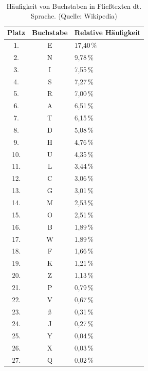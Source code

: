 \begin{table}[h!]
    \setlength{\tabcolsep}{0.5em}
    \def\arraystretch{1.5}
    \centering
    \begin{tabular}{|c|c|l|}
        \hline
        \textbf{Platz} & \textbf{Buchstabe} & \textbf{Relative Häufigkeit} \\
        \hline
       1.  & E  & 17{,}40\,\% \\  \hline
        2.  & N  & 9{,}78\,\% \\ \hline
        3.  & I  & 7{,}55\,\% \\ \hline
        4.  & S  & 7{,}27\,\% \\ \hline
        5.  & R  & 7{,}00\,\% \\ \hline
        6.  & A  & 6{,}51\,\% \\ \hline
        7.  & T  & 6{,}15\,\% \\ \hline
        8.  & D  & 5{,}08\,\% \\ \hline
        9.  & H  & 4{,}76\,\% \\ \hline
        10. & U  & 4{,}35\,\% \\ \hline
        11. & L  & 3{,}44\,\% \\ \hline
        12. & C  & 3{,}06\,\% \\ \hline
        13. & G  & 3{,}01\,\% \\ \hline
        14. & M  & 2{,}53\,\% \\ \hline
        15. & O  & 2{,}51\,\% \\ \hline
        16. & B  & 1{,}89\,\% \\ \hline
        17. & W  & 1{,}89\,\% \\ \hline
        18. & F  & 1{,}66\,\% \\ \hline
        19. & K  & 1{,}21\,\% \\ \hline
        20. & Z  & 1{,}13\,\% \\ \hline
        21. & P  & 0{,}79\,\% \\ \hline
        22. & V  & 0{,}67\,\% \\ \hline
        23. & \ss{} & 0{,}31\,\% \\ \hline
        24. & J  & 0{,}27\,\% \\ \hline
        25. & Y  & 0{,}04\,\% \\ \hline
        26. & X  & 0{,}03\,\% \\ \hline
        27. & Q  & 0{,}02\,\% \\ \hline
    \end{tabular}
    \caption{Häufigkeit von Buchstaben in Fließtexten dt. Sprache. (Quelle: Wikipedia)}
    \label{tab:bh_fliess}
\end{table}


